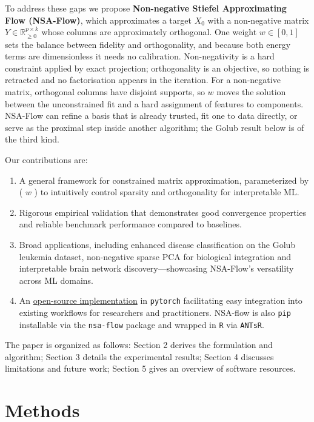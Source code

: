 \documentclass[
]{article}
\begin{document}
To address these gaps we propose \textbf{Non-negative Stiefel Approximating Flow (NSA-Flow)}, which approximates a target \(X_0\) with a non-negative matrix \(Y \in \mathbb{R}^{p \times k}_{\geq 0}\) whose columns are approximately orthogonal. One weight \(w \in [0,1]\) sets the balance between fidelity and orthogonality, and because both energy terms are dimensionless it needs no calibration. Non-negativity is a hard constraint applied by exact projection; orthogonality is an objective, so nothing is retracted and no factorisation appears in the iteration. For a non-negative matrix, orthogonal columns have disjoint supports, so \(w\) moves the solution between the unconstrained fit and a hard assignment of features to components. NSA-Flow can refine a basis that is already trusted, fit one to data directly, or serve as the proximal step inside another algorithm; the Golub result below is of the third kind.

Our contributions are:

\begin{enumerate}
\def\labelenumi{\arabic{enumi}.}
\item
  A general framework for constrained matrix approximation, parameterized by ( \(w\) ) to intuitively control sparsity and orthogonality for interpretable ML.
\item
  Rigorous empirical validation that demonstrates good convergence properties and reliable benchmark performance compared to baselines.
\item
  Broad applications, including enhanced disease classification on the Golub leukemia dataset, non-negative sparse PCA for biological integration and interpretable brain network discovery---showcasing NSA-Flow's versatility across ML domains.
\item
  An \href{https://github.com/stnava/nsa-flow}{open-source implementation} in \texttt{pytorch} facilitating easy integration into existing workflows for researchers and practitioners. NSA-flow is also \texttt{pip} installable via the \texttt{nsa-flow} package and wrapped in \texttt{R} via \texttt{ANTsR}.
\end{enumerate}

The paper is organized as follows: Section 2 derives the formulation and algorithm; Section 3 details the experimental results; Section 4 discusses limitations and future work; Section 5 gives an overview of software resources.

\section{Methods}\label{methods}
\end{document}
